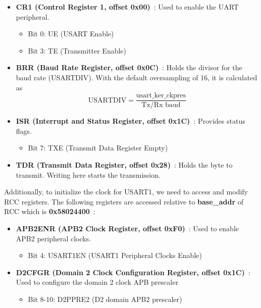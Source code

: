\documentclass[12pt,a4paper]{article}
\begin{document}
\begin{itemize}
    \item \textbf{CR1 (Control Register 1, offset 0x00)}~\cite[pp.~2069]{ref-manual}: Used to enable the UART peripheral.
        \begin{itemize}
            \item Bit 0: UE (USART Enable)
            \item Bit 3: TE (Transmitter Enable)
        \end{itemize}
    \item \textbf{BRR (Baud Rate Register, offset 0x0C)}~\cite[pp.~2085]{ref-manual}: Holds the divisor for the baud rate (USARTDIV). With the default oversampling of 16, it is calculated as~\cite[pp.~2036]{ref-manual}
    \begin{equation}
    \label{eq: usart}
        \text{USARTDIV} = \frac{\text{usart\_ker\_ckpres}}{\text{Tx/Rx baud}}
    \end{equation}
    \item \textbf{ISR (Interrupt and Status Register, offset 0x1C)}~\cite[pp.~2088]{ref-manual}: Provides status flags.
        \begin{itemize}
            \item Bit 7: TXE (Transmit Data Register Empty)
        \end{itemize}
    \item \textbf{TDR (Transmit Data Register, offset 0x28)}~\cite[pp.~2101]{ref-manual}: Holds the byte to transmit. Writing here starts the transmission.
\end{itemize}

Additionally, to initialize the clock for USART1, we need to access and modify RCC registers. The following registers are accessed relative to \textbf{base\_addr} of RCC which is \textbf{0x58024400}~\cite[pp.~132]{ref-manual}:

\begin{itemize}
    \item \textbf{APB2ENR (APB2 Clock Register, offset 0xF0)}~\cite[pp.~467]{ref-manual}: Used to enable APB2 peripheral clocks.
        \begin{itemize}
            \item Bit 4: USART1EN (USART1 Peripheral Clocks Enable)
        \end{itemize}
    \item \textbf{D2CFGR (Domain 2 Clock Configuration Register, offset 0x1C)}~\cite[pp.~395]{ref-manual}: Used to configure the domain 2 clock APB prescaler
        \begin{itemize}
            \item Bit 8-10: D2PPRE2 (D2 domain APB2 prescaler)
        \end{itemize}
\end{itemize}
\end{document}
